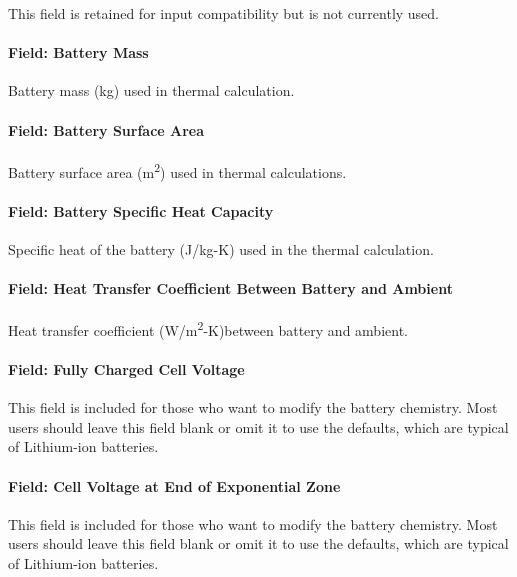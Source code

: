 This field is retained for input compatibility but is not currently used.

\paragraph{Field: Battery Mass}\label{liion-mass}

Battery mass (kg) used in thermal calculation.

\paragraph{Field: Battery Surface Area}\label{liion-surf-area}

Battery surface area (m\textsuperscript{2}) used in thermal calculations.

\paragraph{Field: Battery Specific Heat Capacity}\label{liion-cp}

Specific heat of the battery (J/kg-K) used in the thermal calculation.

\paragraph{Field: Heat Transfer Coefficient Between Battery and Ambient}\label{liion-h}

Heat transfer coefficient (W/m\textsuperscript{2}-K)between battery and ambient.

\paragraph{Field: Fully Charged Cell Voltage}\label{liion-vfull}

This field is included for those who want to modify the battery chemistry. Most users should leave this field blank or omit it to use the defaults, which are typical of Lithium-ion batteries.

\paragraph{Field: Cell Voltage at End of Exponential Zone}\label{liion-vexp}

This field is included for those who want to modify the battery chemistry. Most users should leave this field blank or omit it to use the defaults, which are typical of Lithium-ion batteries.

